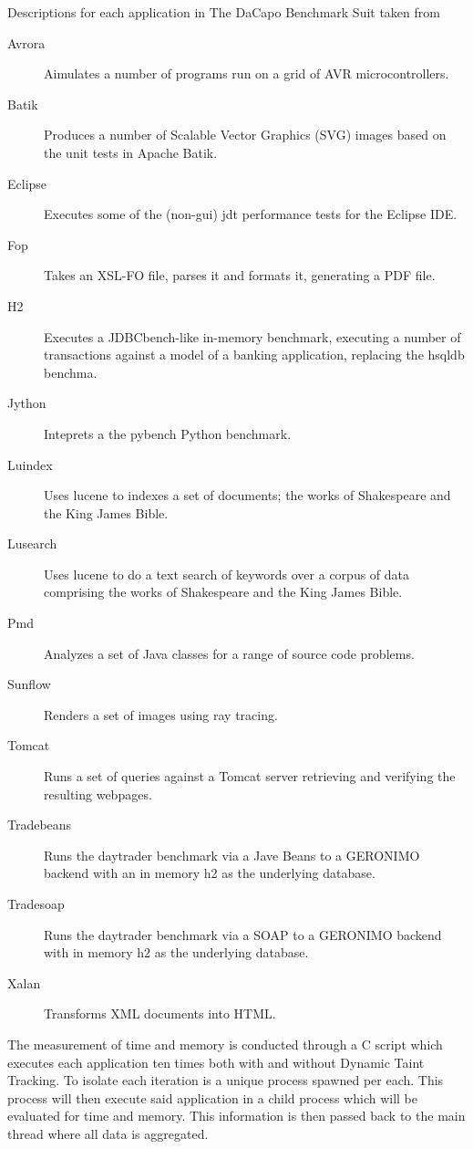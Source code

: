 \begin{table}[!hbt]
  \centering
  \caption{Descriptions for each application in The DaCapo Benchmark Suit taken from \textcite{dacapoBench}}
	\label{table:DaCapoTests}
	\begin{description}
		\item [Avrora] Aimulates a number of programs run on a grid of AVR microcontrollers.
		\item [Batik] Produces a number of Scalable Vector Graphics (SVG) images based on the unit tests in Apache Batik.
		\item [Eclipse] Executes some of the (non-gui) jdt performance tests for the Eclipse IDE.
		\item [Fop] Takes an XSL-FO file, parses it and formats it, generating a PDF file.
		\item [H2] Executes a JDBCbench-like in-memory benchmark, executing a number of transactions against a model of a banking application, replacing the hsqldb benchma.
		\item [Jython] Inteprets a the pybench Python benchmark.
		\item [Luindex] Uses lucene to indexes a set of documents; the works of Shakespeare and the King James Bible.
		\item [Lusearch] Uses lucene to do a text search of keywords over a corpus of data comprising the works of Shakespeare and the King James Bible.
		\item [Pmd] Analyzes a set of Java classes for a range of source code problems.
		\item [Sunflow] Renders a set of images using ray tracing.
		\item [Tomcat] Runs a set of queries against a Tomcat server retrieving and verifying the resulting webpages.
		\item [Tradebeans] Runs the daytrader benchmark via a Jave Beans to a GERONIMO backend with an in memory h2 as the underlying database.
		\item [Tradesoap] Runs the daytrader benchmark via a SOAP to a GERONIMO backend with in memory h2 as the underlying database.
		\item [Xalan] Transforms XML documents into HTML.
	\end{description}
\end{table}


The measurement of time and memory is conducted through a C script which executes each application ten times both with and without Dynamic Taint Tracking. To isolate each iteration is a unique process spawned per each. This process will then execute said application in a child process which will be evaluated for time and memory. This information is then passed back to the main thread where all data is aggregated.  

